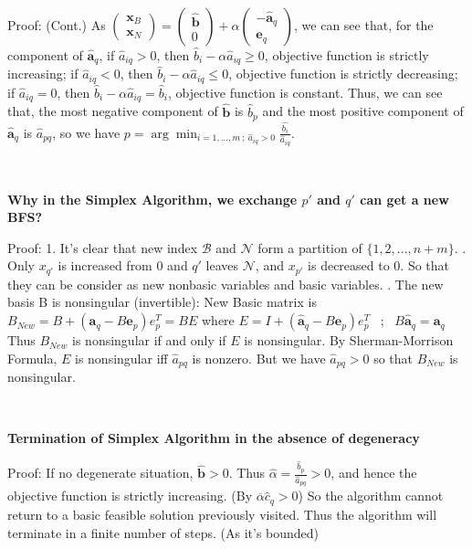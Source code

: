 \documentclass[9pt]{article}
\begin{document}
Proof: (Cont.) As $\begin{pmatrix}\mathbf{x}_B \\ \mathbf{x}_N\end{pmatrix}=\begin{pmatrix}\widehat{\mathbf{b}} \\ 0\end{pmatrix}+\alpha\begin{pmatrix}-\widehat{\mathbf{a}}_q \\ \mathbf{e}_q\end{pmatrix}$, we can see that, for the component of $\widehat{\mathbf{a}}_q$, if $\widehat{a}_{iq}>0$, then $\widehat{b}_i-\alpha\widehat{a}_{iq}\ge0$, objective function is strictly increasing; if $\widehat{a}_{iq}<0$, then $\widehat{b}_i-\alpha\widehat{a}_{iq}\le0$, objective function is strictly decreasing; if $\widehat{a}_{iq}=0$, then $\widehat{b}_i-\alpha\widehat{a}_{iq}=\widehat{b}_i$, objective function is constant. 
Thus, we can see that, the most negative component of $\widehat{\mathbf{b}}$ is $\widehat{b}_p$ and the most positive component of $\widehat{\mathbf{a}}_q$ is $\widehat{a}_{pq}$, so we have $p=\arg\min_{i=1,...,m \ ; \ \widehat{a}_{iq}>0}\frac{\widehat{b_i}}{\widehat{a}_{iq}}$.

~

\textbf{Why in the Simplex Algorithm, we exchange $p'$ and $q'$ can get a new BFS?}

Proof: 1. It's clear that new index $\mathcal{B}$ and $\mathcal{N}$ form a partition of $\{1,2,...,n+m\}$. . Only $x_{q'}$ is increased from 0 and $q'$ leaves $\mathcal{N}$, and $x_{p'}$ is decreased to 0. So that they can be consider as new nonbasic variables and basic variables. . The new basis B is nonsingular (invertible): New Basic matrix is $B_{New}=B+(\mathbf{a}_q-B\mathbf{e}_p)e_p^T=BE$ where $E=I+(\widehat{\mathbf{a}}_q-B\mathbf{e}_p)e_p^T$ \ ; \ $B\widehat{\mathbf{a}}_q=\mathbf{a}_q$
Thus $B_{New}$ is nonsingular if and only if $E$ is nonsingular. \quad By {Sherman-Morrison Formula}, $E$ is nonsingular iff $\widehat{a}_{pq}$ is nonzero. But we have $\widehat{a}_{pq}>0$ so that $B_{New}$ is nonsingular.

~

\textbf{Termination of Simplex Algorithm in the absence of degeneracy}

Proof: If no degenerate situation, $\widehat{\mathbf{b}}>0$. Thus $\widehat{\alpha}=\frac{\widehat{b}_p}{\widehat{a}_{pq}}>0$, and hence the objective function is strictly increasing. (By $\overline{\alpha}\widehat{c}_q>0$) So the algorithm cannot return to a basic feasible solution previously visited. Thus the algorithm will terminate in a finite number of steps. (As it's bounded)
\end{document}
